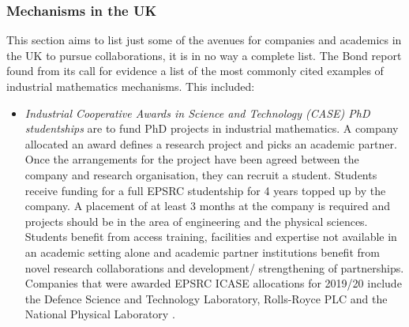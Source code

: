 \documentclass[11pt]{article} %
\begin{document}
	\subsubsection{ Mechanisms in the UK  }
	This section aims to list just some of the avenues for companies and academics in the UK to pursue collaborations, it is in no way a complete list. The Bond report \cite{Bond} found from its call for evidence a list of the most commonly cited examples of industrial mathematics mechanisms. This included: 
	\begin{itemize}
		\item \textit{Industrial Cooperative Awards in Science and Technology (CASE) PhD studentships } are to fund PhD projects in industrial mathematics.  A company allocated an award defines a research project and picks an academic partner. Once the arrangements for the project have been agreed between the company and research organisation, they can recruit a student. Students receive funding for a full EPSRC studentship for 4 years topped up by the company. A placement of at least 3 months at the company is required and projects should be in the area of engineering and the physical sciences. Students benefit from access training, facilities and expertise not available in an academic setting alone and academic partner institutions benefit from novel research collaborations and  development/ strengthening  of partnerships. Companies that were awarded EPSRC ICASE allocations for 2019/20 include the Defence Science and Technology Laboratory, Rolls-Royce PLC and the National Physical Laboratory \cite{CASE}.  
		

\end{itemize}
\end{document}
